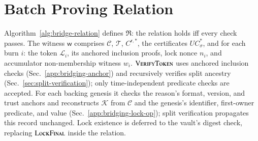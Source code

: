 \section{Batch Proving Relation}\label{app:bridging-relation}

Algorithm~\ref{alg:bridge-relation} defines $\mathfrak{R}$: the relation holds iff every check passes. The witness $\mathsf{w}$ comprises $\mathcal{C}$, $\mathcal{T}$, $C^{\mathsf r,*}$, the certificates $UC^*_\sigma$, and for each burn $i$: the token $\mathcal{L}_i$, its anchored inclusion proofs, lock nonce $n_i$, and accumulator non-membership witness $w_i$. $\Call{VerifyToken}{}$ uses anchored inclusion checks (Sec.~\ref{app:bridging-anchor}) and recursively verifies split ancestry (Sec.~\ref{sec:split-verification}); only time-independent predicate checks are accepted. For each backing genesis it checks the reason's format, version, and trust anchors and reconstructs $\mathcal{K}$ from $\mathcal{C}$ and the genesis's identifier, first-owner predicate, and value (Sec.~\ref{app:bridging-lock-op}); split verification propagates this record unchanged. Lock existence is deferred to the vault's digest check, replacing $\Call{LockFinal}{}$ inside the relation.

